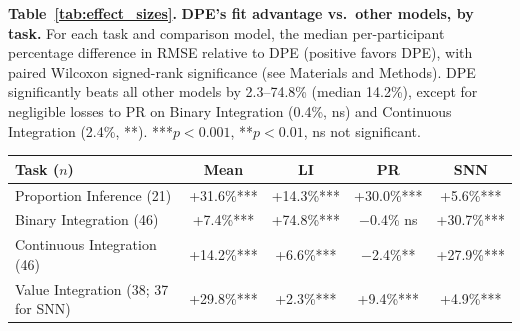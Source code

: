 \vspace{0.6em}
\noindent\begin{minipage}{\textwidth}\color{mscap}\scriptsize
{\textbf{Table~\ref{tab:effect_sizes}.} \textbf{DPE's fit advantage vs.\ other models, by task.} For each task and comparison model, the median per-participant percentage difference in RMSE relative to DPE (positive favors DPE), with paired Wilcoxon signed-rank significance (see Materials and Methods). DPE significantly beats all other models by 2.3--74.8\% (median 14.2\%), except for negligible losses to PR on Binary Integration (0.4\%, ns) and Continuous Integration (2.4\%, **). ***$p<0.001$, **$p<0.01$, ns not significant.\par}
\vspace{0.4em}
\begin{center}
\begin{tabular}{lcccc}
		\hline
		Task ($n$) & Mean & LI & PR & SNN \\
		\hline
		Proportion Inference (21) & +31.6\%*** & +14.3\%*** & +30.0\%*** & +5.6\%*** \\
		Binary Integration (46) & +7.4\%*** & +74.8\%*** & $-$0.4\% ns & +30.7\%*** \\
		Continuous Integration (46) & +14.2\%*** & +6.6\%*** & $-$2.4\%** & +27.9\%*** \\
		Value Integration (38; 37 for SNN) & +29.8\%*** & +2.3\%*** & +9.4\%*** & +4.9\%*** \\
		\hline
	\end{tabular}
\end{center}
\end{minipage}
\vspace{0.8em}

